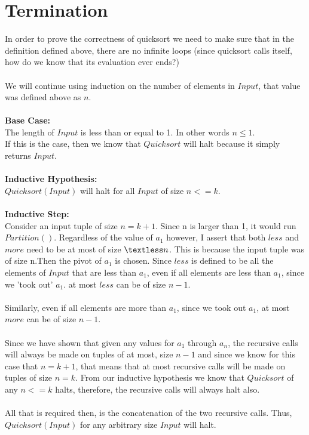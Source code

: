 \documentclass{article}
\begin{document}
\section{Termination}
In order to prove the correctness of quicksort we need to make sure that in the definition defined above, there are no infinite loops (since quicksort calls itself, how do we know that its evaluation ever ends?)
\\\\
We will continue using induction on the number of elements in $Input$, that value was defined above as $n$.
\\\\
\textbf{Base Case:} \\
The length of $Input$ is less than or equal to 1. In other words $n\leq 1$. \\
If this is the case, then we know that $Quicksort$ will halt because it simply returns $Input$.
\\\\
\textbf{Inductive Hypothesis:}\\
$Quicksort(Input)$ will halt for all $Input$ of size $n<=k$.
\\\\
\textbf{Inductive Step:}\\
Consider an input tuple of size $n=k+1$. 
Since n is larger than 1, it would run $Partition()$.
Regardless of the value of $a_{1}$ however, I assert that both $less$ and $more$ need to be at most of size $\textless n$. This is because the input tuple was of size n.Then the pivot of $a_{1}$ is chosen. Since $less$ is defined to be all the elements of $Input$ that are less than $a_{1}$, even if all elements are less than $a_{1}$, since we 'took out' $a_{1}$. at most $less$ can be of size $n-1$.
\\\\
Similarly, even if all elements are more than $a_{1}$, since we took out $a_{1}$, at most $more$ can be of size $n-1$.
\\\\
Since we have shown that given any values for $a_{1}$ through $a_{n}$, the recursive calls will always be made on tuples of at most, size $n-1$ and since we know for this case that $n=k+1$, that means that at most recursive calls will be made on tuples of size $n=k$. From our inductive hypothesis we know that $Quicksort$ of any $n<=k$ halts, therefore, the recursive calls will always halt also. 
\\\\
All that is required then, is the concatenation of the two recursive calls. Thus, $Quicksort(Input)$ for any arbitrary size $Input$ will halt. 
\end{document}
